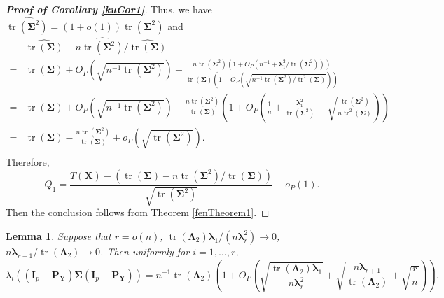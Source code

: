 \documentclass[12pt]{article} %
\DeclareMathOperator{\mytr}{tr}
\newcommand{\bX}{\mathbf{X}}
\newcommand{\bP}{\mathbf{P}}
\newcommand{\bY}{\mathbf{Y}}
\newcommand{\bI}{\mathbf{I}}
\newcommand{\bfsym}[1]{\ensuremath{\boldsymbol{#1}}}
\def\blambda {\bfsym {\lambda}}
\def\bLambda {\bfsym {\Lambda}}
\def\bSigma {\bfsym {\Sigma}}
\newtheorem{lemma}{Lemma}
\theoremstyle{definition}
\begin{document}
\begin{appendices}
\begin{proof}[\textbf{Proof of Corollary \ref{kuCor1}}]
Thus, we have $
\widehat{\mytr(\bSigma^2)}
= (1+o(1))\mytr(\bSigma^2) 
$
and
\begin{equation*}
    \begin{split}
    &\widehat{\mytr(\bSigma)}-n\widehat{\mytr(\bSigma^2)}/\widehat{\mytr(\bSigma)}
    \\
    =
    &\mytr(\bSigma) +O_P(\sqrt{n^{-1}\mytr(\bSigma^2)})
    -\frac{n\mytr(\bSigma^2)(1+O_P(n^{-1}+\blambda_1^2/\mytr(\bSigma^2)))}{\mytr(\bSigma)(1+O_P(\sqrt{n^{-1}\mytr(\bSigma^2)/\mytr^2(\bSigma)}))}
    \\
    =
    &\mytr(\bSigma) +O_P(\sqrt{n^{-1}\mytr(\bSigma^2)})
    -\frac{n\mytr(\bSigma^2)}{\mytr(\bSigma)}
    \left(1+O_P \left(\frac{1}{n}+\frac{\blambda_1^2}{\mytr(\bSigma^2)}+\sqrt{\frac{\mytr(\bSigma^2)}{n\mytr^2(\bSigma)}}\right)\right)
    \\
    =
    &\mytr(\bSigma)
    -\frac{n\mytr(\bSigma^2)}{\mytr(\bSigma)}
    +o_P(\sqrt{\mytr(\bSigma^2)}).
    \\
    \end{split}
\end{equation*}
Therefore,
\begin{equation*}
    Q_1=
        \frac{T(\bX)-\left(\mytr(\bSigma)-n\mytr(\bSigma^2)/\mytr(\bSigma)\right)}{\sqrt{\mytr(\bSigma^2)}}
        +o_P(1).
\end{equation*}
Then the conclusion follows from Theorem \ref{fenTheorem1}.
\end{proof}









\begin{lemma}\label{gg:Lemma1}
    Suppose that
    $r=o(n)$, $\mytr(\bLambda_2)\blambda_1/(n\blambda_r^2)\to 0$,
    $n\blambda_{r+1}/\mytr(\bLambda_2)\to 0$.
    Then uniformly for $i=1,\ldots, r$,
\begin{equation*}
    \lambda_i\left(
             (\bI_p -\bP_\bY)\bSigma (\bI_p- \bP_{\bY})
         \right)
         =
             n^{-1}\mytr(\bLambda_2)
             \left(1
             +O_P\left(
                     \sqrt{\frac{\mytr(\bLambda_2)\blambda_1}{n\blambda_r^2}}  
                     +\sqrt{\frac{n\blambda_{r+1}}{\mytr(\bLambda_2)}}
                     +\sqrt{\frac{r}{n}}
             \right)
         \right)
             .
\end{equation*}


\end{lemma}
\end{appendices}
\end{document}
